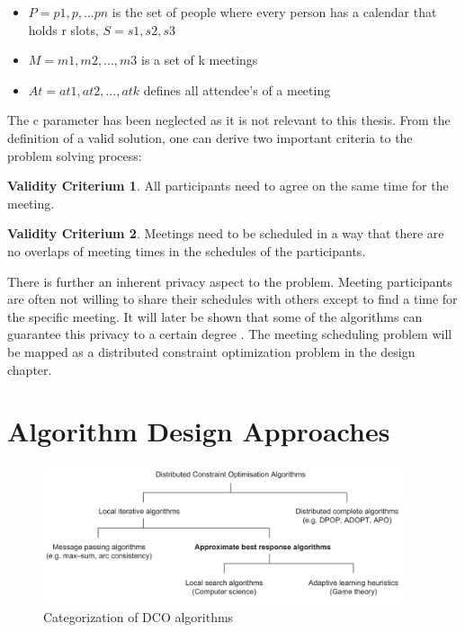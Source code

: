 \begin{itemize}
\item \(P = {p1, p, ... pn}\) is the set of people where every person has a calendar that holds r slots, \(S = {s1,s2,s3}\)
\item \(M = {m1, m2, ..., m3}\) is a set of k meetings
\item \(At = {at1, at2, ..., atk}\) defines all attendee's of a meeting
\end{itemize}

The c parameter has been neglected as it is not relevant to this thesis. From the definition of a valid solution, one can derive two important criteria to the problem solving process:
\theoremstyle{definition}
\newtheorem{hardconstraint1}{Validity Criterium}
\begin{hardconstraint1}
All participants need to agree on the same time for the meeting.
\end{hardconstraint1}
\begin{hardconstraint1}
Meetings need to be scheduled in a way that there are no overlaps of meeting times in the schedules of the participants.
\end{hardconstraint1}
    
There is further an inherent privacy aspect to the problem. Meeting participants are often not willing to share their schedules with others except to find a time for the specific meeting. It will later be shown that some of the algorithms can guarantee this privacy to a certain degree \cite{Farinelli} \cite{Scheduling}. The meeting scheduling problem will be mapped as a distributed constraint optimization problem in the design chapter.
    
\section{Algorithm Design Approaches}

\begin{figure}[h]
\includegraphics[width=400px]{graphics/overview_algos}
\caption{Categorization of DCO algorithms \cite{Chapman2011}}
\label{fig:categorization}
\end{figure}


